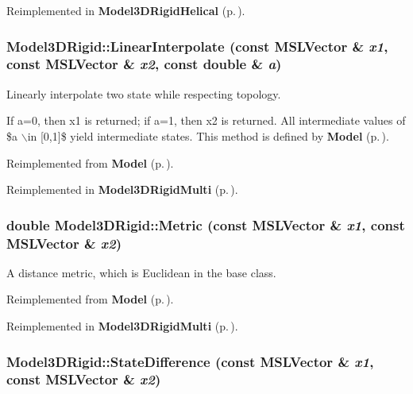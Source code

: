 Reimplemented in {\bf Model3DRigid\-Helical} {\rm (p.\,\pageref{classModel3DRigidHelical_a3})}.
\subsubsection{ Model3DRigid::Linear\-Interpolate (const {\bf MSLVector} \& {\em x1}, const {\bf MSLVector} \& {\em x2}, const double \& {\em a})\hspace{0.3cm}{\tt  [virtual]}}\label{classModel3DRigid_a5}


Linearly interpolate two state while respecting topology.

If a=0, then x1 is returned; if a=1, then x2 is returned. All intermediate values of \$a $\backslash$in [0,1]\$ yield intermediate states. This method is defined by {\bf Model} {\rm (p.\,\pageref{classModel})}. 

Reimplemented from {\bf Model} {\rm (p.\,\pageref{classModel_a6})}.

Reimplemented in {\bf Model3DRigid\-Multi} {\rm (p.\,\pageref{classModel3DRigidMulti_a4})}.
\subsubsection{\setlength{\rightskip}{0pt plus 5cm}double Model3DRigid::Metric (const {\bf MSLVector} \& {\em x1}, const {\bf MSLVector} \& {\em x2})\hspace{0.3cm}{\tt  [virtual]}}\label{classModel3DRigid_a4}


A distance metric, which is Euclidean in the base class.



Reimplemented from {\bf Model} {\rm (p.\,\pageref{classModel_a9})}.

Reimplemented in {\bf Model3DRigid\-Multi} {\rm (p.\,\pageref{classModel3DRigidMulti_a2})}.
\subsubsection{ Model3DRigid::State\-Difference (const {\bf MSLVector} \& {\em x1}, const {\bf MSLVector} \& {\em x2})\hspace{0.3cm}{\tt  [virtual]}}\label{classModel3DRigid_a6}



